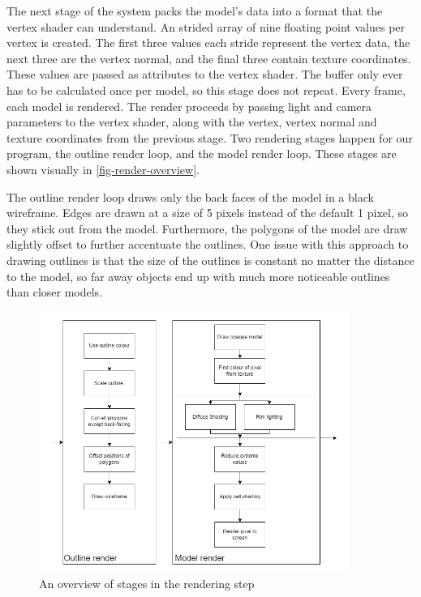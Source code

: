 The next stage of the system packs the model's data into a format that the vertex shader can 
understand. An strided array of nine floating point values per vertex is created. The first three
values each stride represent the vertex data, the next three are the vertex normal, and the final 
three contain texture coordinates. These values are passed as attributes to the vertex shader.
The buffer only ever has to be calculated once per model, so this stage does not repeat. 
Every frame, each model is rendered. The render proceeds by passing light and camera parameters to 
the vertex shader, along with the vertex, vertex normal and texture coordinates from the previous 
stage. Two rendering stages happen for our program, the outline render loop, and the model render
loop. These stages are shown visually in \autoref{fig-render-overview}.

The outline render loop draws only the back faces of the model in a black wireframe. Edges
are drawn at a size of 5 pixels instead of the default 1 pixel, so they stick out from the model.
Furthermore, the polygons of the model are draw slightly offset to further accentuate the outlines.
One issue with this approach to drawing outlines is that the size of the outlines is constant no 
matter the distance to the model, so far away objects end up with much more noticeable outlines
than closer models.

\begin{figure}[h]
    \centering
    \includegraphics[width=0.9\textwidth]{img/rendering-overview.png}
    \caption{An overview of stages in the rendering step}
    \label{fig-render-overview}
\end{figure}

